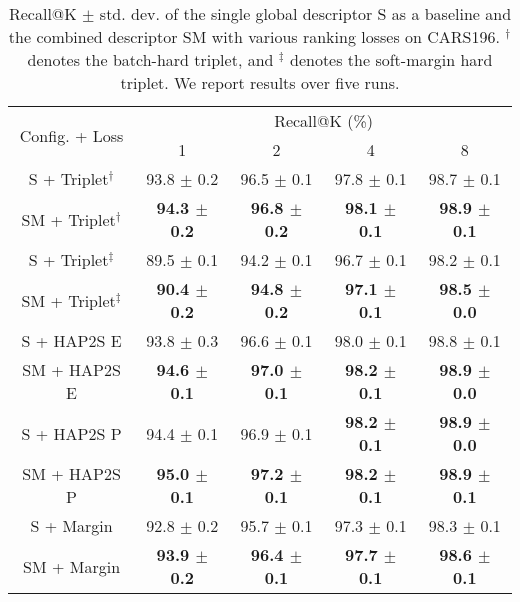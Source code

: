 \documentclass[10pt,twocolumn,letterpaper]{article}
\begin{document}
\begin{CJK}{UTF8}{mj}
\begin{table}[t!]
\begin{center}

\begin{adjustbox}{width=.5\textwidth,center}
\begin{tabular}{c|cccc}
\hline
\multirow{2}{*}{Config. + Loss}                             & \multicolumn{4}{c}{Recall@K (\%)}                 \\ \cline{2-5}
                                                           & 1          & 2          & 4          & 8          \\ \hline\hline
S + Triplet$^\dagger$          & 93.8 $\pm$ 0.2 & 96.5 $\pm$ 0.1 & 97.8 $\pm$ 0.1 & 98.7 $\pm$ 0.1 \\
SM + Triplet$^\dagger$         & \textbf{94.3 $\pm$ 0.2} & \textbf{96.8 $\pm$ 0.2} & \textbf{98.1 $\pm$ 0.1} & \textbf{98.9 $\pm$ 0.1} \\ \hline
S + Triplet$^\ddagger$         & 89.5 $\pm$ 0.1 & 94.2 $\pm$ 0.1 & 96.7 $\pm$ 0.1 & 98.2 $\pm$ 0.1 \\
SM + Triplet$^\ddagger$        & \textbf{90.4 $\pm$ 0.2} & \textbf{94.8 $\pm$ 0.2} & \textbf{97.1 $\pm$ 0.1} & \textbf{98.5 $\pm$ 0.0} \\ \hline
S + HAP2S E                              & 93.8 $\pm$ 0.3 & 96.6 $\pm$ 0.1 & 98.0 $\pm$ 0.1 & 98.8 $\pm$ 0.1 \\
SM + HAP2S E                             & \textbf{94.6 $\pm$ 0.1} & \textbf{97.0 $\pm$ 0.1} & \textbf{98.2 $\pm$ 0.1} & \textbf{98.9 $\pm$ 0.0} \\ \hline
S + HAP2S P                              & 94.4 $\pm$ 0.1 & 96.9 $\pm$ 0.1 & \textbf{98.2 $\pm$ 0.1} & \textbf{98.9 $\pm$ 0.0} \\
SM + HAP2S P                             & \textbf{95.0 $\pm$ 0.1} & \textbf{97.2 $\pm$ 0.1} & \textbf{98.2 $\pm$ 0.1} & \textbf{98.9 $\pm$ 0.1} \\ \hline
S + Margin                           & 92.8 $\pm$ 0.2 & 95.7 $\pm$ 0.1 & 97.3 $\pm$ 0.1 & 98.3 $\pm$ 0.1 \\
SM + Margin                          & \textbf{93.9 $\pm$ 0.2} & \textbf{96.4 $\pm$ 0.1} & \textbf{97.7 $\pm$ 0.1} & \textbf{98.6 $\pm$ 0.1} \\ \hline
\end{tabular}
\end{adjustbox}


\end{center}

\caption{Recall@K $\pm$ std. dev. of the single global descriptor S as a baseline and the combined descriptor SM with various ranking losses on CARS196. $^\dagger$ denotes the batch-hard triplet, and $^\ddagger$ denotes the soft-margin hard triplet.
We report results over five runs.}
\label{table:losses}
\vspace{-0.3em}
\end{table}


\end{CJK}
\end{document}
